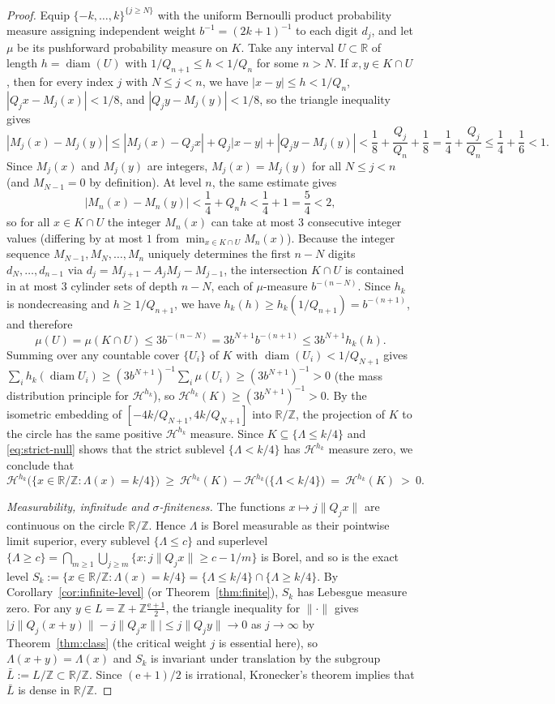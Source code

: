 \documentclass[11pt]{article}
\theoremstyle{definition}
\theoremstyle{remark}
\newcommand{\R}{\mathbb{R}}
\newcommand{\Z}{\mathbb{Z}}
\newcommand{\ee}{\mathrm{e}}
\newcommand{\Lam}{\Lambda}
\begin{document}
\begin{proof}
Equip $\{-k,\dots,k\}^{\{j\ge N\}}$ with the uniform Bernoulli product
probability measure assigning independent weight $b^{-1}=(2k+1)^{-1}$ to each
digit $d_j$, and let $\mu$ be its pushforward probability measure on $K$. Take
any interval $U\subset\R$ of length $h=\operatorname{diam}(U)$ with
$1/Q_{n+1}\le h<1/Q_n$ for some $n>N$. If $x,y\in K\cap U$, then for every index
$j$ with $N\le j<n$, we have $|x-y|\le h<1/Q_n$, $|Q_jx-M_j(x)|<1/8$, and
$|Q_jy-M_j(y)|<1/8$, so the triangle inequality gives
\[
|M_j(x)-M_j(y)|
\le|M_j(x)-Q_jx|+Q_j|x-y|+|Q_jy-M_j(y)|
<\frac18+\frac{Q_j}{Q_n}+\frac18=\frac14+\frac{Q_j}{Q_n}\le\frac14+\frac16<1.
\]
Since $M_j(x)$ and $M_j(y)$ are integers, $M_j(x)=M_j(y)$ for all $N\le j<n$
(and $M_{N-1}=0$ by definition). At level $n$, the same estimate gives
\[
|M_n(x)-M_n(y)|<\frac14+Q_n h<\frac14+1=\frac54<2,
\]
so for all $x\in K\cap U$ the integer $M_n(x)$ can take at most $3$ consecutive
integer values (differing by at most $1$ from $\min_{x\in K\cap U}M_n(x)$).
Because the integer sequence $M_{N-1},M_N,\dots,M_n$ uniquely determines the
first $n-N$ digits $d_N,\dots,d_{n-1}$ via $d_j=M_{j+1}-A_jM_j-M_{j-1}$, the
intersection $K\cap U$ is contained in at most $3$ cylinder sets of depth $n-N$,
each of $\mu$-measure $b^{-(n-N)}$. Since $h_k$ is nondecreasing and
$h\ge1/Q_{n+1}$, we have $h_k(h)\ge h_k(1/Q_{n+1})=b^{-(n+1)}$, and therefore
\[
\mu(U)=\mu(K\cap U)\le 3b^{-(n-N)}=3b^{N+1}b^{-(n+1)}\le 3b^{N+1}h_k(h).
\]
Summing over any countable cover $\{U_i\}$ of $K$ with
$\operatorname{diam}(U_i)<1/Q_{N+1}$ gives
$\sum_i h_k(\operatorname{diam}U_i)\ge(3b^{N+1})^{-1}\sum_i\mu(U_i)\ge(3b^{N+1})^{-1}>0$
(the mass distribution principle for $\mathcal H^{h_k}$), so
$\mathcal H^{h_k}(K)\ge(3b^{N+1})^{-1}>0$. By the isometric embedding of
$[-4k/Q_{N+1},4k/Q_{N+1}]$ into $\R/\Z$, the projection of $K$ to the circle has
the same positive $\mathcal H^{h_k}$ measure. Since $K\subseteq\{\Lam\le k/4\}$
and \eqref{eq:strict-null} shows that the strict sublevel $\{\Lam<k/4\}$ has
$\mathcal H^{h_k}$ measure zero, we conclude that
\[
 \mathcal H^{h_k}\bigl(\{x\in\R/\Z:\Lam(x)=k/4\}\bigr)
 \ \ge\ \mathcal H^{h_k}(K)-\mathcal H^{h_k}\bigl(\{\Lam<k/4\}\bigr)
 \ =\ \mathcal H^{h_k}(K)\ >\ 0 .
\]

\emph{Measurability, infinitude and $\sigma$-finiteness.} The functions
$x\mapsto j\|Q_jx\|$ are continuous on the circle $\R/\Z$. Hence $\Lam$ is Borel
measurable as their pointwise limit superior, every sublevel $\{\Lam\le c\}$ and
superlevel $\{\Lam\ge c\}=\bigcap_{m\ge1}\bigcup_{j\ge m}\{x:j\|Q_jx\|\ge c-1/m\}$
is Borel, and so is the exact level
$S_k:=\{x\in\R/\Z:\Lam(x)=k/4\}=\{\Lam\le k/4\}\cap\{\Lam\ge k/4\}$. By
Corollary~\ref{cor:infinite-level} (or Theorem~\ref{thm:finite}), $S_k$ has
Lebesgue measure zero. For any $y\in L=\Z+\Z\frac{\ee+1}{2}$, the triangle
inequality for $\|\cdot\|$ gives
$\bigl|j\|Q_j(x+y)\|-j\|Q_jx\|\bigr|\le j\|Q_jy\|\to0$ as $j\to\infty$ by
Theorem~\ref{thm:class} (the critical weight $j$ is essential here), so
$\Lam(x+y)=\Lam(x)$ and $S_k$ is invariant under translation by the subgroup
$\bar L:=L/\Z\subset\R/\Z$. Since $(\ee+1)/2$ is irrational, Kronecker's theorem
implies that $\bar L$ is dense in $\R/\Z$.


\end{proof}
\end{document}
